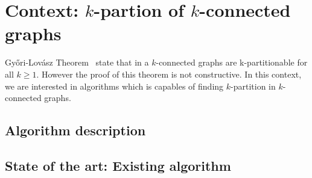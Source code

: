 \section{Context: $k$-partion of $k$-connected graphs}
Gy{\H o}ri-Lovász Theorem~\cite{GE78,LL77} state that in a $k$-connected graphs are 
k-partitionable for all $k \geq 1$. However the proof of this theorem
is not constructive. In this context, we are interested in algorithms which
is capables of finding $k$-partition in $k$-connected graphs.

\subsection{Algorithm description}


\subsection{State of the art: Existing algorithm}

